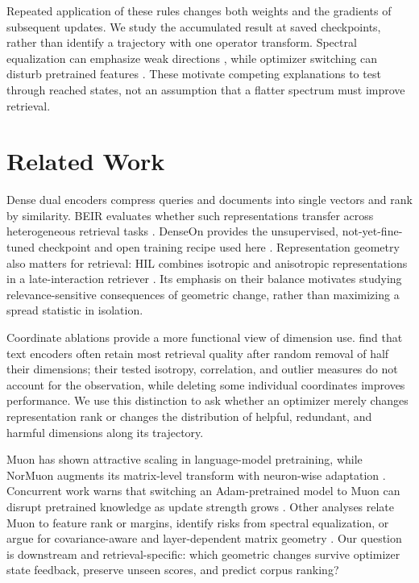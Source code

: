 \documentclass[11pt]{article}
\begin{document}
Repeated application of these rules changes both weights and the gradients of subsequent updates.
We study the accumulated result at saved checkpoints, rather than identify a trajectory with one
operator transform. Spectral equalization can emphasize weak directions
\citep{pang2026htmuon}, while optimizer switching can disturb pretrained features
\citep{qu2026finetune}. These motivate competing explanations to test through reached states,
not an assumption that a flatter spectrum must improve retrieval.

\section{Related Work}

Dense dual encoders compress queries and documents into single vectors and rank by similarity.
BEIR evaluates whether such representations transfer across heterogeneous retrieval tasks
\citep{thakur2021beir}. DenseOn provides the unsupervised, not-yet-fine-tuned checkpoint and open
training recipe used here \citep{sourty2026denseon}. Representation geometry also matters for
retrieval: HIL combines isotropic and anisotropic representations in a late-interaction retriever
\citep{kim2024hil}. Its emphasis on their balance motivates studying relevance-sensitive
consequences of geometric change, rather than maximizing a spread statistic in isolation.

Coordinate ablations provide a more functional view of dimension use. \citet{takeshita2025dimensions}
find that text encoders often retain most retrieval quality after random removal of half their
dimensions; their tested isotropy, correlation, and outlier measures do not account for the
observation, while deleting some individual coordinates improves performance. We use this distinction to ask whether an optimizer
merely changes representation rank or changes the distribution of helpful, redundant, and harmful
dimensions along its trajectory.

Muon has shown attractive scaling in language-model pretraining, while NorMuon augments its
matrix-level transform with neuron-wise adaptation \citep{liu2025muon,li2025normuon}. Concurrent
work warns that switching an Adam-pretrained model to Muon can disrupt pretrained knowledge as
update strength grows \citep{qu2026finetune,liu2026consistency}. Other analyses relate Muon to
feature rank or margins, identify risks from spectral equalization, or argue for covariance-aware
and layer-dependent matrix geometry \citep{ruan2026features,pang2026htmuon,du2026newtonmuon,
massena2026schatten}. Our question is downstream and retrieval-specific: which geometric changes
survive optimizer state feedback, preserve unseen scores, and predict corpus ranking?
\end{document}
